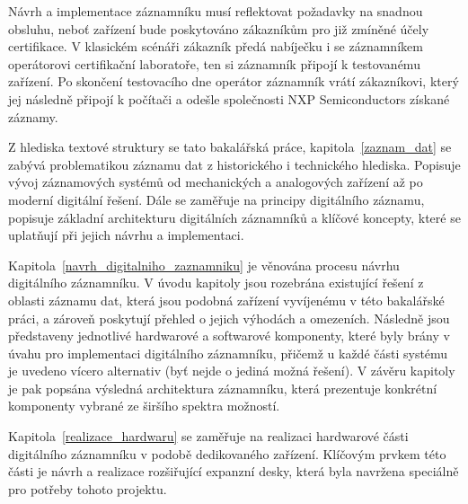 Návrh a implementace záznamníku musí reflektovat požadavky na snadnou obsluhu, neboť zařízení bude poskytováno zákazníkům pro již zmíněné účely certifikace. V klasickém scénáři zákazník předá nabíječku i se záznamníkem operátorovi certifikační laboratoře, ten si záznamník připojí k testovanému zařízení. Po skončení testovacího dne operátor záznamník vrátí zákazníkovi, který jej následně připojí k počítači a odešle společnosti NXP Semiconductors získané záznamy.

Z hlediska textové struktury se tato bakalářská práce, kapitola~\ref{zaznam_dat} se zabývá problematikou záznamu dat z historického i technického hlediska. Popisuje vývoj záznamových systémů od mechanických a analogových zařízení až po moderní digitální řešení. Dále se zaměřuje na principy digitálního záznamu, popisuje základní architekturu digitálních záznamníků a klíčové koncepty, které se uplatňují při jejich návrhu a implementaci.

Kapitola~\ref{navrh_digitalniho_zaznamniku}  je věnována procesu návrhu digitálního záznamníku. V úvodu kapitoly jsou rozebrána existující řešení z oblasti záznamu dat, která jsou podobná zařízení vyvíjenému v této bakalářské práci, a zároveň poskytují přehled o jejich výhodách a omezeních. Následně jsou představeny jednotlivé hardwarové a softwarové komponenty, které byly brány v úvahu pro implementaci digitálního záznamníku, přičemž u každé části systému je uvedeno vícero alternativ (byť nejde o jediná možná řešení). V závěru kapitoly je pak popsána výsledná architektura záznamníku, která prezentuje konkrétní komponenty vybrané ze širšího spektra možností.

Kapitola~\ref{realizace_hardwaru} se zaměřuje na realizaci hardwarové části digitálního záznamníku v podobě dedikovaného zařízení. Klíčovým prvkem této části je návrh a realizace rozšiřující expanzní desky, která byla navržena speciálně pro potřeby tohoto projektu.


